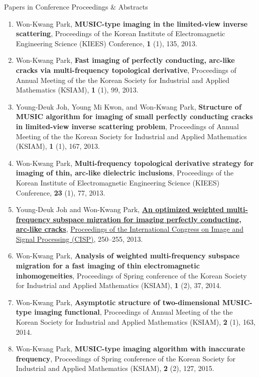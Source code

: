 \documentclass{resume} %
\begin{document}
\begin{rSection}{Papers in Conference Proceedings \& Abstracts}
\begin{enumerate}
\item\label{C-KIEES2013A} Won-Kwang Park, \textbf{MUSIC-type imaging in the limited-view inverse scattering}, Proceedings of the Korean Institute of Electromagnetic Engineering Science (KIEES) Conference, \textbf{1} (1), 135, 2013.
\item\label{C-KSIAM2013D} Won-Kwang Park, \textbf{Fast imaging of perfectly conducting, arc-like cracks via multi-frequency topological derivative}, Proceedings of Annual Meeting of the the Korean Society for Industrial and Applied Mathematics (KSIAM), \textbf{1} (1), 99, 2013.
\item\label{C-KSIAM2013E} Young-Deuk Joh, Young Mi Kwon, and Won-Kwang Park, \textbf{Structure of MUSIC algorithm for imaging of small perfectly conducting cracks in limited-view inverse scattering problem}, Proceedings of Annual Meeting of the the Korean Society for Industrial and Applied Mathematics (KSIAM), \textbf{1} (1), 167, 2013.
\item\label{C-KIEES2013B} Won-Kwang Park, \textbf{Multi-frequency topological derivative strategy for imaging of thin, arc-like dielectric inclusions}, Proceedings of the Korean Institute of Electromagnetic Engineering Science (KIEES) Conference, \textbf{23} (1), 77, 2013.
\item\label{C-CISP2013B} Young-Deuk Joh and Won-Kwang Park, \href{http://dx.doi.org/10.1109/CISP.2013.6743996}{\textbf{An optimized weighted multi-frequency subspace migration for imaging perfectly conducting, arc-like cracks}}, \href{http://ieeexplore.ieee.org/xpl/mostRecentIssue.jsp?punumber=6731781}{Proceedings of the  International Congress on Image and Signal Processing (CISP)}, 250--255, 2013.
\item\label{C-KSIAM2014A} Won-Kwang Park, \textbf{Analysis of weighted multi-frequency subspace migration for a fast imaging of thin electromagnetic inhomogeneities}, Proceedings of Spring conference of the Korean Society for Industrial and Applied Mathematics (KSIAM), \textbf{1} (2), 37, 2014.
\item\label{C-KSIAM2014B} Won-Kwang Park, \textbf{Asymptotic structure of two-dimensional MUSIC-type imaging functional}, Proceedings of Annual Meeting of the the Korean Society for Industrial and Applied Mathematics (KSIAM), \textbf{2} (1), 163, 2014.
\item\label{C-KSIAM2015A} Won-Kwang Park, \textbf{MUSIC-type imaging algorithm with inaccurate frequency}, Proceedings of Spring conference of the Korean Society for Industrial and Applied Mathematics (KSIAM), \textbf{2} (2), 127, 2015.

\end{enumerate}
\end{rSection}
\end{document}
